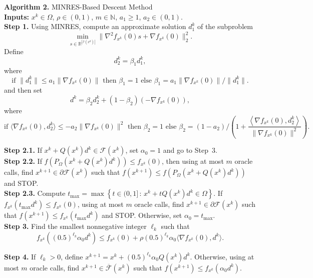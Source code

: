\documentclass[11pt]{article}
\begin{document}
\begin{mdframed}
\noindent\textbf{Algorithm 2.} MINRES-Based Descent Method
\\[0.2cm]
\noindent\textbf{Inputs:} $x^{k}\in\Omega$, $\rho\in (0,1)$, $m\in\mathbb{N}$, $a_{1}\geq 1$, $a_2\in(0,1)$.
\\[0.2cm]
\noindent\textbf{Step 1.} Using MINRES, compute an approximate solution $d_{1}^{k}$ of the subproblem
\[
\min_{s\in\mathbb{R}^{|\mathcal{I}(x^{k})|}}\|\nabla^{2}f_{x^{k}}(0)s+\nabla f_{x^{k}}(0)\|_{2}^{2}.
\]
Define 
\begin{equation} \label{eq:direction1}
d_{2}^{k}=\beta_{1}d_{1}^{k},
\end{equation}
where 
\begin{equation} \label{eq:beta1}
\text{if } \|d_{1}^{k}\|\leq a_{1}\|\nabla f_{x^{k}}(0)\| \text{ then } \beta_1=1 
\text{ else } \beta_1=a_{1} \|\nabla f_{x^{k}}(0)\| / \|d_{1}^{k}\|.
\end{equation}
and then set
\begin{equation} \label{eq:direction2}
d^{k}=\beta_{2}d_{2}^{k}+(1-\beta_{2})\left(-\nabla f_{x^{k}}(0)\right),
\end{equation}
where
\begin{equation} \label{eq:beta2}
\text{if } \langle \nabla f_{x^{k}}(0), d^{k}_{2} \rangle \leq -a_{2} \|\nabla f_{x^{k}}(0)\|^{2} \text{ then } \beta_2=1 \text{ else }
\beta_2 = ( 1-a_{2} ) / \left(1+\frac{\left\langle\nabla f_{x^{k}}(0),d_{2}^{k}\right\rangle}{\|\nabla f_{x^{k}}(0)\|^{2}}\right).
\end{equation}

\noindent\textbf{Step 2.1.} If $x^{k}+Q(x^{k})d^{k} \in \mathcal{F}(x^{k})$, set $\alpha_0=1$ and go to Step~3.
\\[0.2cm]
\noindent\textbf{Step 2.2.} If $f(P_{\Omega}(x^k+Q(x^{k})d^{k})) \leq f_{x^{k}}(0)$, then using at most $m$ oracle calls, find $x^{k+1} \in \partial \mathcal{F}(x^{k})$ such that $f(x^{k+1}) \leq f(P_{\Omega}(x^k+Q(x^k) d^k))$ and STOP.
\\[0.2cm]
\noindent\textbf{Step 2.3.} Compute $t_{\max}=\max\left\{t\in (0,1]\,:\,x^{k}+t Q(x^{k})d^{k}\in\Omega\right\}$. If $f_{x^k}(t_{\max} d^k) \leq f_{x^{k}}(0)$, using at most $m$ oracle calls, find $x^{k+1} \in \partial \mathcal{F}(x^{k})$ such that $f(x^{k+1}) \leq f_{x^k}(t_{\max} d^k)$ and STOP. Otherwise, set $\alpha_0 = t_{\max}$.
\\[0.2cm]
\noindent\textbf{Step 3.} Find the smallest nonnegative integer $\ell_{k}$ such that
\begin{equation} \label{eq:2.3}
f_{x^k}((0.5)^{\ell_{k}} \alpha_0 d^k) \leq f_{x^{k}}(0)+\rho (0.5)^{\ell_{k}} \alpha_0 \langle\nabla f_{x^{k}}(0),d^{k}\rangle.
\end{equation}

\noindent\textbf{Step 4.} If $\ell_k>0$, define $x^{k+1}=x^k+(0.5)^{\ell_{k}} \alpha_0 Q(x^k) d^k$. Otherwise, using at most $m$ oracle calls, find $x^{k+1} \in \overline{\mathcal{F}}(x^{k})$ such that $f(x^{k+1}) \leq f_{x^k}(\alpha_0 d^k)$.
\end{mdframed}
\end{document}
